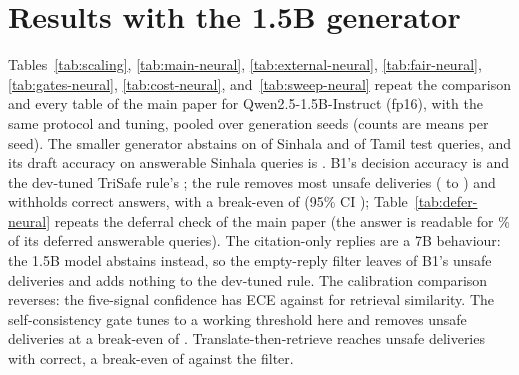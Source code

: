 \section{Results with the 1.5B generator}
Tables~\ref{tab:scaling}, \ref{tab:main-neural}, \ref{tab:external-neural}, \ref{tab:fair-neural}, \ref{tab:gates-neural}, \ref{tab:cost-neural}, and~\ref{tab:sweep-neural} repeat the comparison and every table of the main paper for Qwen2.5-1.5B-Instruct (fp16), with the same protocol and tuning, pooled over \Nseeds{} generation seeds (counts are means per seed). The smaller generator abstains on \NModelAbstsi{} of Sinhala and \NModelAbstta{} of Tamil test queries, and its draft accuracy on answerable Sinhala queries is \NDraftAccsi. B1's decision accuracy is \NBoneDec{} and the dev-tuned TriSafe rule's \NTunDec; the rule removes most unsafe deliveries (\NBoneUnsafe{} to \NTunUnsafe) and withholds \NTunLost{} correct answers, with a break-even of \NTunBreakEven{} (95\% CI \NTunBreakEvenCI); Table~\ref{tab:defer-neural} repeats the deferral check of the main paper (the answer is readable for \NTunDeferVisReadPct\% of its deferred answerable queries). The citation-only replies are a 7B behaviour: the 1.5B model abstains instead, so the empty-reply filter leaves \NBemptyUnsafe{} of B1's \NBoneUnsafe{} unsafe deliveries and adds nothing to the dev-tuned rule. The calibration comparison reverses: the five-signal confidence has ECE \NTunEce{} against \NBoneEce{} for retrieval similarity. The self-consistency gate tunes to a working threshold here and removes \NEsevenRemoved{} unsafe deliveries at a break-even of \NEsevenBreakEven. Translate-then-retrieve reaches \NEsixUnsafe{} unsafe deliveries with \NEsixCorrect{} correct, a break-even of \NEsixBreakEvenEmpty{} against the filter.










